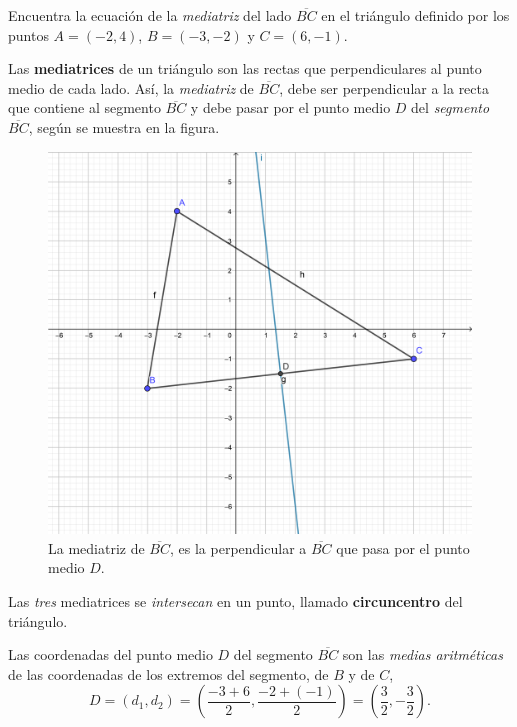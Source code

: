 \documentclass[12pt,letterpaper]{article}
\author{\textsc{Manuel López Mateos}}
\makeatletter
\let\elautor\@author
\makeatother
\begin{document}
%
\bigskip 

\noindent Encuentra la ecuación de la  \emph{\color{purple}mediatriz} del lado $\overline{BC}$ en el triángulo definido por los puntos $A=(-2,4)$, $B=(-3,-2)$ y $C=(6,-1)$.
\medskip

Las \textbf{\color{purple}mediatrices} de un triángulo son las rectas que perpendiculares al punto medio de cada lado. Así, la \emph{mediatriz} de $\overline{BC}$, debe ser perpendicular a la recta que contiene al segmento $\overline{BC}$ y debe pasar por el punto medio $D$ del \emph{segmento} $\overline{BC}$, según se muestra en la figura. 
\begin{figure}[ht]
\centering
\includegraphics[scale=0.31]{img/mediatriz-triang.png}
\caption{La mediatriz de $\overline{BC}$, es la perpendicular a $\overline{BC}$ que pasa por el punto medio $D$.}\label{fig:mediatriz}
\end{figure}

Las \emph{tres} mediatrices se \emph{\color{purple}intersecan} en un punto, llamado \textbf{\color{purple}circuncentro} del triángulo.

Las coordenadas del punto medio $D$ del segmento $\overline{BC}$ son las \emph{\color{purple}medias aritméticas} de las coordenadas de los extremos del segmento, de $B$ y de $C$,
\begin{equation*}
D=(d_1,d_2)=\left(\frac{-3+6}{2},\frac{-2+(-1)}{2}\right) =\left(\frac{3}{2},-\frac{3}{2}\right).
\end{equation*} 
\end{document}
